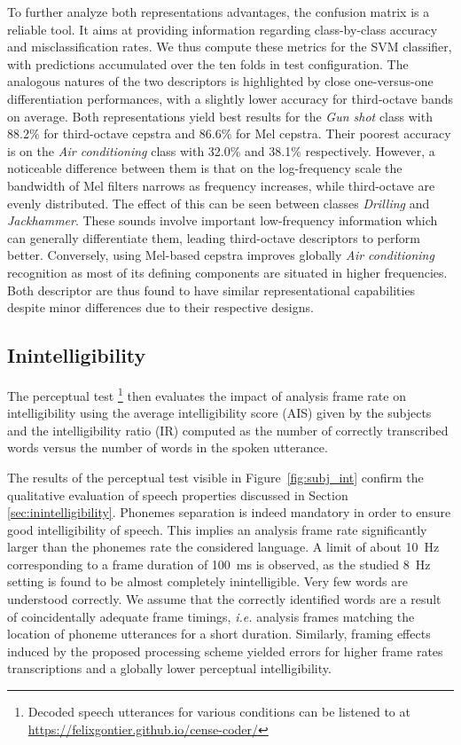 \documentclass[sensors,article,submit,moreauthors,pdftex,10pt,a4paper]{mdpi}
\begin{document}
To further analyze both representations advantages, the confusion matrix is a reliable tool. It aims at providing information regarding class-by-class accuracy and misclassification rates. We thus compute these metrics for the SVM classifier, with predictions accumulated over the ten folds in test configuration. The analogous natures of the two descriptors is highlighted by close one-versus-one differentiation performances, with a slightly lower accuracy for third-octave bands on average. Both representations yield best results for the \textit{Gun shot} class with 88.2\% for third-octave cepstra and 86.6\% for Mel cepstra. Their poorest accuracy is on the \textit{Air conditioning} class with 32.0\% and 38.1\% respectively. However, a noticeable difference between them is that on the log-frequency scale the bandwidth of Mel filters narrows as frequency increases, while third-octave are evenly distributed. The effect of this can be seen between classes \textit{Drilling} and \textit{Jackhammer}. These sounds involve important low-frequency information which can generally differentiate them, leading third-octave descriptors to perform better. Conversely, using Mel-based cepstra improves globally \textit{Air conditioning} recognition as most of its defining components are situated in higher frequencies.\\

Both descriptor are thus found to have similar representational capabilities despite minor differences due to their respective designs.


\subsection{Inintelligibility}

The perceptual test \footnote{Decoded speech utterances for various conditions can be listened to at \url{https://felixgontier.github.io/cense-coder/}} then evaluates the impact of analysis frame rate on intelligibility using the average intelligibility score (AIS) given by the subjects and the intelligibility ratio (IR) computed as the number of correctly transcribed words versus the number of words in the spoken utterance.

The results of the perceptual test visible in Figure~\ref{fig:subj_int} confirm the qualitative evaluation of speech properties discussed in Section \ref{sec:inintelligibility}. Phonemes separation is indeed mandatory in order to ensure good intelligibility of speech. This implies an analysis frame rate significantly larger than the phonemes rate the considered language. A limit of about 10~Hz corresponding to a frame duration of 100~ms is observed, as the studied 8~Hz setting is found to be almost completely inintelligible. Very few words are understood correctly. We assume that the correctly identified words are a result of coincidentally adequate frame timings, \textit{i.e.} analysis frames matching the location of phoneme utterances for a short duration. Similarly, framing effects induced by the proposed processing scheme yielded errors for higher frame rates transcriptions and a globally lower perceptual intelligibility.\\
\end{document}
